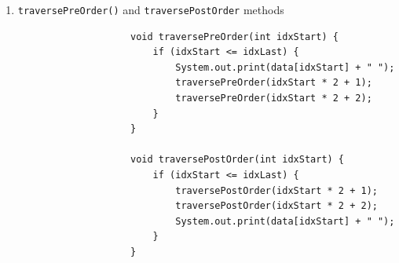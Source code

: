 \documentclass[12pt,titlepage]{article}
\begin{document}
\begin{enumerate}
{\begin{enumerate}[label=\alph*.)]
{                \begin{verbatim}
                    void add(int data) {
                        int currentIdx = 0;
                        while (true) {
                            if (currentIdx >= idxLast) {
                                break;
                            }
                            if (data > this.data[currentIdx]) {
                                currentIdx = currentIdx * 2 + 2;
                            } else if (data < this.data[currentIdx]) {
                                currentIdx = currentIdx * 2 + 1;
                            } else {
                                break;
                            }
                        }
                        this.data[currentIdx] = data;
                    }
                \end{verbatim}
            }
            \item {
                \texttt{traversePreOrder()} and \texttt{traversePostOrder} methods

                \begin{verbatim}
                    void traversePreOrder(int idxStart) {
                        if (idxStart <= idxLast) {
                            System.out.print(data[idxStart] + " ");
                            traversePreOrder(idxStart * 2 + 1);
                            traversePreOrder(idxStart * 2 + 2);
                        }
                    }

                    void traversePostOrder(int idxStart) {
                        if (idxStart <= idxLast) {
                            traversePostOrder(idxStart * 2 + 1);
                            traversePostOrder(idxStart * 2 + 2);
                            System.out.print(data[idxStart] + " ");
                        }
                    }
                \end{verbatim}
            }
        \end{enumerate}
    }
\end{enumerate}
\end{document}
